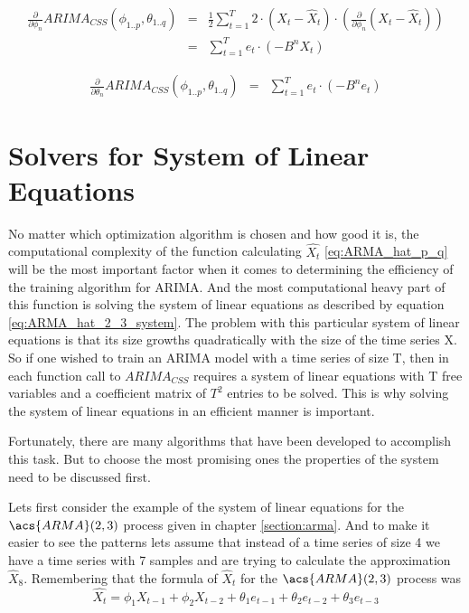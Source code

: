 \begin{equation}\label{eq:gradient_arima_phi}
	\begin{array}{lcl}
		\frac{\partial}{\partial \phi_n} ARIMA_{CSS}(\phi_{1..p}, \theta_{1..q}) &=& \frac{1}{2}\displaystyle\sum_{t=1}^{T} 2 \cdot (X_t - \hat{X}_t) \cdot (\frac{\partial}{\partial \phi_n} (X_t - \hat{X}_t))\\
        &=& \displaystyle\sum_{t=1}^{T} e_t \cdot  (-B^n X_t)
	\end{array}
\end{equation}

\begin{equation}\label{eq:gradient_arima_theta}
	\begin{array}{lcl}
		\frac{\partial}{\partial \theta_n} ARIMA_{CSS}(\phi_{1..p}, \theta_{1..q}) &=& \displaystyle\sum_{t=1}^{T} e_t \cdot  (-B^n e_t)
	\end{array}
\end{equation}

\pagebreak

\section{Solvers for System of Linear Equations }\label{linsys_solvers}

No matter which optimization algorithm is chosen and how good it is, the computational complexity of the function calculating $\hat{X_t}$ \eqref{eq:ARMA_hat_p_q} will be the most important factor when it comes to determining the efficiency of the training algorithm for \acs{ARIMA}. And the most computational heavy part of this function is solving the system of linear equations as described by equation \ref{eq:ARMA_hat_2_3_system}. The problem with this particular system of linear equations is that its size growths quadratically with the size of the time series X. So if one wished to train an \acs{ARIMA} model with a time series of size T, then in each function call to $ARIMA_{CSS}$ requires a system of linear equations with T free variables and a coefficient matrix of $T^2$ entries to be solved. This is why solving the system of linear equations in an efficient manner is important.

Fortunately, there are many algorithms that have been developed to accomplish this task. But to choose the most promising ones the properties of the system need to be discussed first.

Lets first consider the example of the system of linear equations for the $\acs{ARMA}(2,3)$ process given in chapter \ref{section:arma}. And to make it easier to see the patterns lets assume that instead of a time series of size 4 we have a time series with 7 samples and are trying to calculate the approximation $\hat{X}_8$. Remembering that the formula of $\hat{X}_t$ for the $\acs{ARMA}(2,3)$ process was
\begin{equation}\label{eq:ARMA_hat_2_3_remember}
    \hat{X_t} = \phi_1 X_{t-1} + \phi_2 X_{t-2} + \theta_1 e_{t-1} + \theta_2 e_{t-2}+ \theta_3 e_{t-3}
\end{equation}

